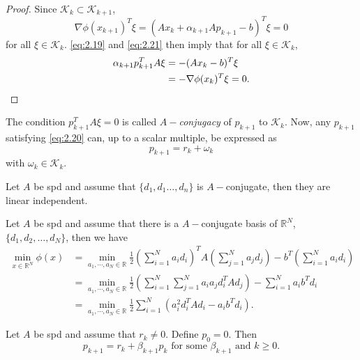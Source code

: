 \begin{proof}
  Since $\mathcal{K}_k\subset \mathcal{K}_{k+1}$,
  \begin{equation}
    \label{eq:2.21}
    \nabla\phi(x_{k+1})^T\xi=(Ax_k+\alpha_{k+1}Ap_{k+1}-b)^T\xi=0
  \end{equation}
  for all $\xi\in\mathcal{K}_k.$ \eqref{eq:2.19} and \eqref{eq:2.21}
  then imply that for all $\xi\in\mathcal{K}_k$,
  \begin{equation}
    \label{eq:2.22}
    \begin{split}
      \alpha_{k+1}p_{k+1}^TA\xi &= -(Ax_k-b)^T\xi \\
      &=-\nabla\phi(x_k)^T\xi=0.\qedhere
    \end{split}
  \end{equation}
\end{proof}

\begin{rmk}
  The condition $p_{k+1}^TA\xi = 0$ is called $A-$\emph{conjugacy} of
  $p_{k+1}$ to $\mathcal{K}_k$. Now, any $p_{k+1}$ satisfying
  \eqref{eq:2.20} can, up to a scalar multiple, be expressed as
  $$p_{k+1}=r_k+\omega_k$$
  with $\omega_k\in\mathcal{K}_k.$
\end{rmk}

\begin{lemma}
  Let $A$ be spd and assume that $\{d_1,d_1\ldots,d_n\}$ is
  $A-$conjugate, then they are linear independent.
\end{lemma}

\begin{rmk}
  Let $A$ be spd and assume that there is a $A-$conjugate basis of
  $\mathbb{R}^N$, $\{d_1,d_2,\ldots,d_N\}$, then we have
  \begin{equation*}
    \begin{aligned}
      \min_{x\in\mathbb{R}^N}\phi(x)&=\min_{a_1,\cdots,a_N
        \in\mathbb{R}}\frac{1}{2}(\sum\limits_{i=1}^Na_id_i)^TA(\sum\limits_{j=1}^Na_jd_j)-b^T(\sum\limits_{i=1}^Na_id_i)
      \\
      &=\min_{a_1,\cdots,a_N
        \in\mathbb{R}}\frac{1}{2}(\sum\limits_{i=1}^N\sum\limits_{j=1}^Na_ia_jd_i^TAd_j)-\sum\limits_{i=1}^Na_ib^Td_i\\
      &=\min_{a_1,\cdots,a_N
        \in\mathbb{R}}\frac{1}{2}\sum\limits_{i=1}^N(a_i^2d_i^TAd_i-a_ib^Td_i).
    \end{aligned}
  \end{equation*}
\end{rmk}
\begin{thm}
  Let $A$ be spd and assume that $r_k\neq 0.$ Define $p_0=0.$ Then
  \begin{equation}
    \label{eq:2.23}
    p_{k+1}=r_k+\beta_{k+1}p_k\text{ for some $\beta_{k+1}$ and }k\geq 0.
  \end{equation}
\end{thm}

